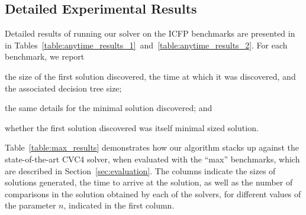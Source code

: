 \newpage
\renewcommand{\thesection}{\appendixname~\Alph{section}}
\begin{appendices}
\section{Detailed Experimental Results}
\label{section:appendix_experimental_results}




\vspace*{-1ex}
Detailed results of running our solver on the ICFP benchmarks are
presented in in
Tables~\ref{table:anytime_results_1}~and~\ref{table:anytime_results_2}. For
each benchmark,
we report
\begin{inparaenum}[(a)]
\item the size of the first solution discovered, the time at which it
was discovered, and the associated decision tree size;
\item the same details for the minimal solution discovered; and
\item whether the first solution discovered was itself minimal sized
  solution.
\end{inparaenum}

Table~\ref{table:max_results} demonstrates how our algorithm stacks up
against the state-of-the-art CVC4 solver, when evaluated with the
``max'' benchmarks, which are described in Section~\ref{sec:evaluation}.
The columns indicate the sizes of solutions generated, the time to arrive
at the solution, as well as the number of comparisons in the solution
obtained by each of the solvers, for different values of the parameter
$n$, indicated in the first column.


\end{appendices}
